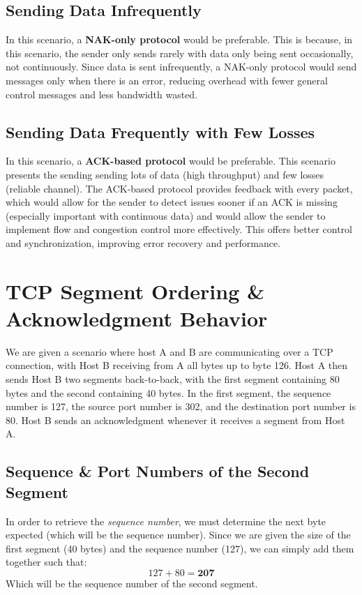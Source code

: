 \documentclass[colorlinks=true, allcolors=blue]{article}
\begin{document}
\subsection{Sending Data Infrequently}
In this scenario, a \textbf{NAK-only protocol} would be preferable. This is because, in this scenario, the sender only sends rarely with data only being sent occasionally, not continuously. Since data is sent infrequently, a NAK-only protocol would send messages only when there is an error, reducing overhead with fewer general control messages and less bandwidth wasted. 
\subsection{Sending Data Frequently with Few Losses}
In this scenario, a \textbf{ACK-based protocol} would be preferable. This scenario presents the sending sending lots of data (high throughput) and few losses (reliable channel). The ACK-based protocol provides feedback with every packet, which would allow for the sender to detect issues sooner if an ACK is missing (especially important with continuous data) and would allow the sender to implement flow and congestion control more effectively. This offers better control and synchronization, improving error recovery and performance.

\setcounter{section}{26}
\section{TCP Segment Ordering \& Acknowledgment Behavior}
We are given a scenario where host A and B are communicating over a TCP connection, with Host B receiving from A all bytes up to byte 126. Host A then sends Host B two segments back-to-back, with the first segment containing 80 bytes and the second containing 40 bytes. In the first segment, the sequence number is 127, the source port number is 302, and the destination port number is 80. Host B sends an acknowledgment whenever it receives a segment from Host A.
\subsection{Sequence \& Port Numbers of the Second Segment}
In order to retrieve the \textit{sequence number}, we must determine the next byte expected (which will be the sequence number). Since we are given the size of the first segment (40 bytes) and the sequence number (127), we can simply add them together such that:
\[
127 + 80 = \textbf{207}
\]
Which will be the sequence number of the second segment. \\
\end{document}
